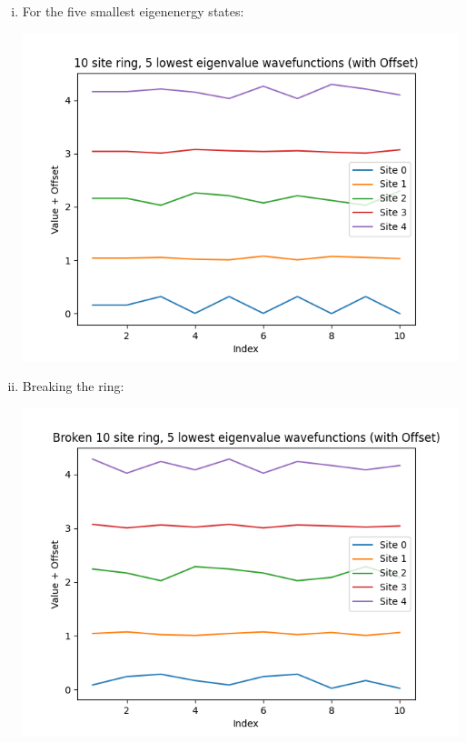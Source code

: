 \documentclass[11pt]{article}
\begin{document}
\begin{enumerate}[(i).]
  \item For the five smallest eigenenergy states:
  \begin{center}
    \includegraphics*[scale=0.7]{plots/Q3part1.png}
  \end{center}

  \item Breaking the ring:
  \begin{center}
    \includegraphics*[scale=0.7]{plots/Q3part2.png}
  \end{center}


\end{enumerate}
\end{document}
